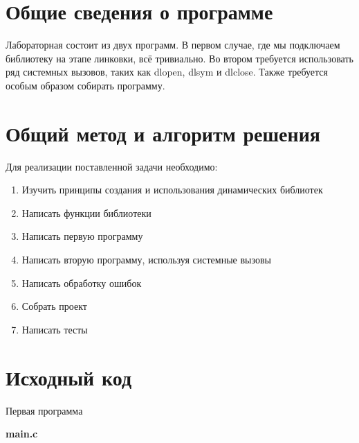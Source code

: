 \section{Общие сведения о программе}

Лабораторная состоит из двух программ. В первом случае, где мы подключаем библиотеку на этапе линковки, всё тривиально. Во втором требуется использовать ряд системных вызовов, таких как dlopen, dlsym и dlclose. Также требуется особым образом собирать программу.

\section{Общий метод и алгоритм решения}

Для реализации поставленной задачи необходимо:

\begin{enumerate}
    \item Изучить принципы создания и использования динамических библиотек
    \item Написать функции библиотеки
    \item Написать первую программу
    \item Написать вторую программу, используя системные вызовы
    \item Написать обработку ошибок
    \item Собрать проект
    \item Написать тесты
\end{enumerate}

\pagebreak

\section{Исходный код}

{\large Первая программа}

\textbf{main.c}


